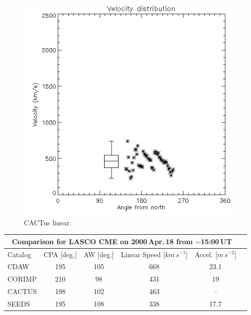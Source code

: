 \documentclass[preprint2]{aastex}
\begin{document}
\begin{figure}[]
\centerline{\includegraphics[width=\linewidth]{images/20000418_cactus_speed.png}}
\caption{CACTus linear.}
\label{}
\end{figure}


\begin{table}
\begin{tabular}{l*{4}{c}r}
\multicolumn{5}{c}{Comparison for LASCO CME on 2000\,Apr.\,18 from $\sim$15:00\,UT} \\
\hline
Catalog              & CPA [deg.] & AW [deg.] & Linear Speed [$km\,s^{-1}$] & Accel. [$m\,s^{-2}$]  \\
\hline
CDAW & 195 & 105 & 668 & 23.1    \\
CORIMP            & 210 & 98 & 431 & 19   \\
CACTUS           & 198 & 102 & 463 & --    \\
SEEDS     & 195 & 108 & 338 & 17.7    \\
\end{tabular}
\end{table}

\acknowledgments
\end{document}
